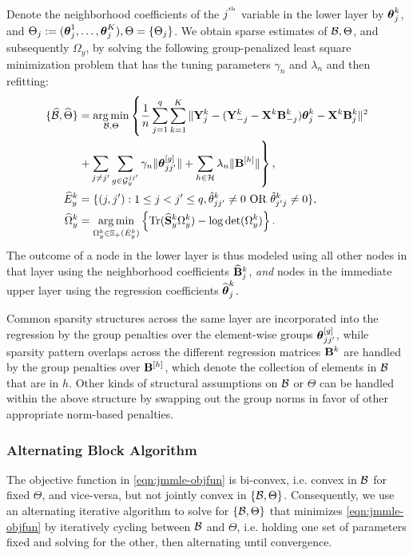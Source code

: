 Denote the neighborhood coefficients of the $j^{\operatorname*{^{\text{th}}}}$ variable in the lower layer by ${\boldsymbol{\theta}}_j^k$, and $\Theta_j := ({\boldsymbol{\theta}}_j^1, \ldots, {\boldsymbol{\theta}}_j^K), \Theta = \{ \Theta_j \}$. We obtain sparse estimates of ${\cal{B}}, \Theta$, and subsequently $\Omega_y$, by solving the following group-penalized least square minimization problem that has the tuning parameters $\gamma_n$ and $\lambda_n$ and then refitting:
%
\begin{align}
\{ \widehat {{\cal{B}}}, \widehat \Theta \} &= 
\operatorname*{arg\,min}_{{\cal{B}}, \Theta} \left\{ \frac{1}{n} \sum_{j=1}^q \sum_{k=1}^K \| {\mathbf{Y}}^k_j - ({\mathbf{Y}}_{-j}^k - {\mathbf{X}}^k {\mathbf{B}}_{-j}^k) {\boldsymbol{\theta}}_j^k - {\mathbf{X}}^k {\mathbf{B}}_j^k \|^2 \right. \notag\\
& \left. + \sum_{j \neq j'} \sum_{g \in {\cal{G}}_y^{jj'}} \gamma_n \| {\boldsymbol{\theta}}_{jj'}^{[g]} \| + \sum_{h \in {\cal{H}}} \lambda_n \| {\mathbf{B}}^{[h]} \| \right\}, \label{eqn:jmmle-objfun}\\
\widehat E_y^k &= \{(j,j'): 1 \leq j < j' \leq q, \hat \theta_{jj'}^k \neq 0 \text{ OR } \hat \theta_{j'j}^k \neq 0 \}, \notag\\
\widehat \Omega_y^k &= \operatorname*{arg\,min}_{\Omega_y^k \in {\mathbb{S}}_+ (\hat E_y^k)}
\left\{ \operatorname*{Tr} (\widehat {{\mathbf{S}}}_y^k \Omega_y^k ) - \log \det (\Omega_y^k) \right\}. \label{eqn:omega-y-calc}
\end{align}
%
The outcome of a node in the lower layer is thus modeled using all other nodes in that layer using the neighborhood coefficients $\widehat {{\mathbf{B}}}_j^k$, {\it and} nodes in the immediate upper layer using the regression coefficients $\widehat {{\boldsymbol{\theta}}}_j^k$.

\begin{Remark}
Common sparsity structures across the same layer are incorporated into the regression by the group penalties over the element-wise groups ${\boldsymbol{\theta}}_{jj'}^{[g]}$, while sparsity pattern overlaps across the different regression matrices ${\mathbf{B}}^k$ are handled by the group penalties over ${\mathbf{B}}^{[h]}$, which denote the collection of elements in ${\cal{B}}$ that are in $h$. Other kinds of structural assumptions on ${\cal{B}}$ or $\Theta$ can be handled within the above structure by swapping out the group norms in favor of other appropriate norm-based penalties.
\end{Remark}

\subsubsection{Alternating Block Algorithm}
The objective function in \eqref{eqn:jmmle-objfun} is bi-convex, i.e. convex in ${\cal{B}}$ for fixed $\Theta$, and vice-versa, but not jointly convex in $\{ {\cal{B}}, \Theta \}$. Consequently, we use an alternating iterative algorithm to solve for $\{ {\cal{B}}, \Theta \}$ that minimizes \eqref{eqn:jmmle-objfun} by iteratively cycling between ${\cal{B}}$ and $\Theta$, i.e. holding one set of parameters fixed and solving for the other, then alternating until convergence.

